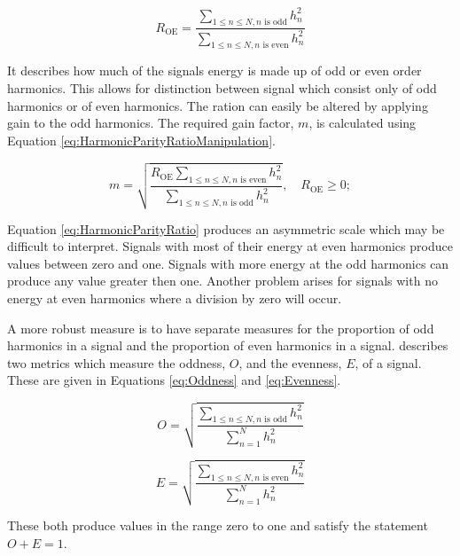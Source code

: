		\begin{equation}
			R_{\textrm{OE}} = \frac{\sum_{1 \leq n \leq N, n \textrm{ is odd}} h_{n}^{2}}
			              {\sum_{1 \leq n \leq N, n \textrm{ is even}} h_{n}^{2}}
			\label{eq:HarmonicParityRatio}
		\end{equation}

		It describes how much of the signals energy is made up of odd or even order harmonics. This allows for
		distinction between signal which consist only of odd harmonics or of even harmonics. The ration can easily
		be altered by applying gain to the odd harmonics. The required gain factor, $m$, is calculated using
		Equation \ref{eq:HarmonicParityRatioManipulation}.

		\begin{equation}
			m = \sqrt{\frac{R_{\textrm{OE}}\sum_{1 \leq n \leq N, n \textrm{ is even}} h_{n}^{2}}
			               {\sum_{1 \leq n \leq N, n \textrm{ is odd}} h_{n}^{2}}},
				       \quad R_{\textrm{OE}} \geq 0;
		       \label{eq:HarmonicParityRatioManipulation}
		\end{equation}

		Equation \ref{eq:HarmonicParityRatio} produces an asymmetric scale which may be difficult to interpret.
		Signals with most of their energy at even harmonics produce values between zero and one. Signals with more
		energy at the odd harmonics can produce any value greater then one. Another problem arises for signals with
		no energy at even harmonics where a division by zero will occur.

		A more robust measure is to have separate measures for the proportion of odd harmonics in a signal and the
		proportion of even harmonics in a signal.  \citet{lukasik2005towards} describes two metrics which measure
		the oddness, $O$, and the evenness, $E$, of a signal. These are given in Equations \ref{eq:Oddness} and
		\ref{eq:Evenness}.

		\begin{equation}
			O = \sqrt{\frac{\sum_{1 \leq n \leq N, n \textrm{ is odd}} h_{n}^{2}}
			               {\sum_{n = 1}^{N} h_{n}^{2}}}
			\label{eq:Oddness}
		\end{equation}

		\begin{equation}
			E = \sqrt{\frac{\sum_{1 \leq n \leq N, n \textrm{ is even}} h_{n}^{2}}
			               {\sum_{n = 1}^{N} h_{n}^{2}}}
			\label{eq:Evenness}
		\end{equation}

		These both produce values in the range zero to one and satisfy the statement $O + E = 1$. 

